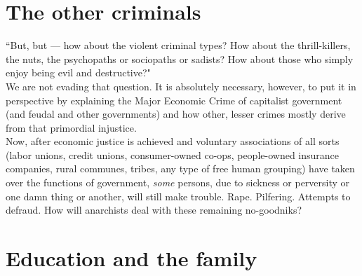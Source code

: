 \section*{The other criminals}

``But, but --- how about the violent criminal types? How about the thrill-killers, the nuts, the psychopaths or sociopaths or sadists? How about those who simply enjoy being evil and destructive?"\\
We are not evading that question. It is absolutely necessary, however, to put it in perspective by explaining the Major Economic Crime of capitalist government (and feudal and other governments) and how other, lesser crimes mostly derive from that primordial injustice.\\
Now, after economic justice is achieved and voluntary associations of all sorts (labor unions, credit unions, consumer-owned co-ops, people-owned insurance companies, rural communes, tribes, any type of free human grouping) have taken over the functions of government, \emph{some} persons, due to sickness or perversity or one damn thing or another, will still make trouble. Rape. Pilfering. Attempts to defraud. How will anarchists deal with these remaining no-goodniks?

\section*{Education and the family}


